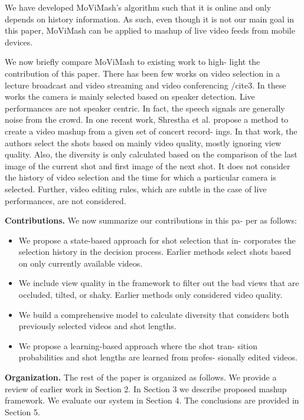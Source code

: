 \documentclass{sig-alternate}
\begin{document}
We have developed MoViMash’s algorithm such that it is online
and only depends on history information. As such, even though
it is not our main goal in this paper, MoViMash can be applied to
mashup of live video feeds from mobile devices.

We now briefly compare MoViMash to existing work to high-
light the contribution of this paper. There has been few works on
video selection in a lecture broadcast and video streaming \cite{21} \cite{6}
and video conferencing /cite{3}. In these works the camera is mainly
selected based on speaker detection. Live performances are not
speaker centric. In fact, the speech signals are generally noise from
the crowd. In one recent work, Shrestha et al. \cite{15} propose a
method to create a video mashup from a given set of concert record-
ings. In that work, the authors select the shots based on mainly
video quality, mostly ignoring view quality. Also, the diversity is
only calculated based on the comparison of the last image of the
current shot and first image of the next shot. It does not consider
the history of video selection and the time for which a particular
camera is selected. Further, video editing rules, which are subtle in
the case of live performances, are not considered.

\textbf{Contributions.} We now summarize our contributions in this pa-
per as follows:
\begin{itemize}
    \item We propose a state-based approach for shot selection that in-
corporates the selection history in the decision process. Earlier methods select shots based on only currently available
videos.
\item We include view quality in the framework to filter out the
bad views that are occluded, tilted, or shaky. Earlier methods
only considered video quality.
\item We build a comprehensive model to calculate diversity that
considers both previously selected videos and shot lengths.
\item We propose a learning-based approach where the shot tran-
sition probabilities and shot lengths are learned from profes-
sionally edited videos.

\end{itemize}
\textbf{Organization.} The rest of the paper is organized as follows.
We provide a review of earlier work in Section 2. In Section 3 we
describe proposed mashup framework. We evaluate our system in
Section 4. The conclusions are provided in Section 5.
\end{document}
